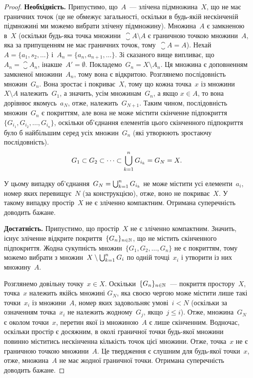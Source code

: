 \begin{proof}
    \textbf{Необхідність.} Припустимо, що~$A$~--- злічена підмножина~$X$, що не має граничних точок (це не обмежує загальності, оскільки в будь-якій нескінченій підмножині ми можемо вибрати злічену підмножину). Множина~$A$ є замкненою в~$X$ (оскільки будь-яка точка множини~$\closure A \setminus A$ є граничною точкою множини~$A$, яка за припущенням не має граничних точок, тому~$\closure A = A$). Нехай $A = \{a_1, s_2, \dots\}$ і~$A_n = \{a_n, a_{n + 1}, \dots\}$. Зі сказаного вище випливає, що~$A_n = \closure A_n$, інакше~$A' = \emptyset$. Покладемо~$G_n = X \setminus A_n$. Ця множина є доповненням замкненої множини~$A_n$, тому вона є відкритою. Розглянемо послідовність множин~$G_n$. Вона зростає і покриває~$X$, тому що кожна точка~$x$ із множини $X \setminus A$ належить~$G_1$, а значить, усім множинам~$G_n$, а якщо $x \in A$, то вона дорівнює якомусь~$a_N$, отже, належить~$G_{N + 1}$. Таким чином, послідовність множин~$G_n$ є покриттям, але вона не може містити скінченне підпокриття $\{G_{i_1}, G_{i_2}, \dots, G_{i_n}\}$, оскільки об’єднання елементів цього скінченного підпокриття було б найбільшим серед усіх множин~$G_n$ (які утворюють зростаючу послідовність).
    \begin{equation*}
        G_1 \subset G_2 \subset \dots \subset \operatorname*{\bigcup}_{k = 1}^n G_{i_k} = G_N = X.
    \end{equation*}

    У цьому випадку об'єднання~$G_N = \operatorname*{\bigcup}_{k = 1}^n G_{i_k}$ не може містити усі елементи~$a_i$, номер яких перевищує~$N$ (за конструкцією), отже, воно не покриває~$X$. У такому випадку простір~$X$ не є зліченно компактним. Отримана суперечність доводить бажане.

    \textbf{Достатність.} Припустимо, що простір~$X$ не є зліченно компактним. Значить, існує зліченне відкрите покриття~$\{G_n\}_{n \in \mathbb{N}}$, що не містить скінченного підпокриття. Жодна сукупність множин~$\{G_1, G_2, \dots, G_n\}$ не є покриттям, тому можемо вибрати з множин~$X \setminus \operatorname*{\bigcup}_{k = 1}^n G_i$ по одній точці~$x_i$ і утворити із них множину~$A$.

    Розглянемо довільну точку~$x \in X$. Оскільки~$\{G_n\}_{n \in \mathbb{N}}$~--- покриття простору~$X$, точка~$x$ належить якійсь множині $G_N$, яка своєю чергою може містити лише такі точки~$x_i$ із множини~$A$, номер яких задовольняє умові~$i < N$ (оскільки за означенням точка~$x_i$ не належить жодному~$G_j$, якщо~$j \le i$). Отже, множина~$G_N$ є околом точки~$x$, перетин якої із множиною~$A$ є лише скінченним. Водночас, оскільки простір є досяжним, в околі граничної точки будь-якої множини повинно міститись нескінченна кількість точок цієї множини. Отже, точка~$x$ не є граничною точкою множини~$A$. Це твердження є слушним для будь-якої точки~$x$, отже, множина~$A$ не має жодної граничної точки. Отримана суперечність доводить бажане.
\end{proof}

